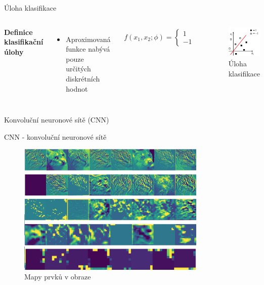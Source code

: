 \documentclass[aspectratio=1610]{beamer}
\begin{document}
\begin{frame}{Úloha klasifikace}
\begin{columns}
	\textbf{Definice klasifikační úlohy}
	\vspace{3mm}
	\begin{itemize}
		\item Aproximovaná funkce nabývá pouze určitých diskrétních hodnot
	\end{itemize}
	\begin{gather}
	f(x_1,x_2;\phi) = 
	\begin{cases}	
	1\\
	-1  
	\end{cases} 
	\end{gather}	
	\begin{figure}[h]
		\begin{center}
			\includegraphics[width=5cm, keepaspectratio]{linsep.png}
		\end{center}
		\caption{Úloha klasifikace} 	
	\end{figure}
\end{columns}
\end{frame}
\begin{frame}{}
\centering
{\Large Konvoluční neuronové sítě (CNN)}	
\end{frame}
\begin{frame}{CNN - konvoluční neuronové sítě}
	\begin{figure}[h]
	\begin{center}
		\includegraphics[width=9cm, keepaspectratio]{maps.png}
	\end{center}
	\caption{Mapy prvků v obraze} 	
\end{figure}
\end{frame}
\end{document}

